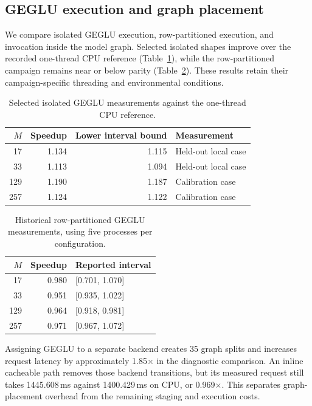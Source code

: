 \documentclass[sigplan,screen,review]{acmart}
\begin{document}
\subsection{GEGLU execution and graph placement}

We compare isolated GEGLU execution, row-partitioned execution, and invocation inside the model graph. Selected isolated shapes improve over the recorded one-thread CPU reference (Table~\ref{tab:geglu-local}), while the row-partitioned campaign remains near or below parity (Table~\ref{tab:geglu-hybrid}). These results retain their campaign-specific threading and environmental conditions.

\begin{table}[t]
\centering
\caption{Selected isolated GEGLU measurements against the one-thread CPU reference.}
\label{tab:geglu-local}
\small
\begin{tabular}{@{}rrrl@{}}
\toprule
$M$ & Speedup & Lower interval bound & Measurement \\
\midrule
17 & 1.134 & 1.115 & Held-out local case \\
33 & 1.113 & 1.094 & Held-out local case \\
129 & 1.190 & 1.187 & Calibration case \\
257 & 1.124 & 1.122 & Calibration case \\
\bottomrule
\end{tabular}
\end{table}

\begin{table}[t]
\centering
\caption{Historical row-partitioned GEGLU measurements, using five processes per configuration.}
\label{tab:geglu-hybrid}
\small
\begin{tabular}{@{}rrl@{}}
\toprule
$M$ & Speedup & Reported interval \\
\midrule
17 & 0.980 & [0.701, 1.070] \\
33 & 0.951 & [0.935, 1.022] \\
129 & 0.964 & [0.918, 0.981] \\
257 & 0.971 & [0.967, 1.072] \\
\bottomrule
\end{tabular}
\end{table}

Assigning GEGLU to a separate backend creates 35 graph splits and increases request latency by approximately 1.85$\times$ in the diagnostic comparison. An inline cacheable path removes those backend transitions, but its measured request still takes 1445.608\,ms against 1400.429\,ms on CPU, or 0.969$\times$. This separates graph-placement overhead from the remaining staging and execution costs.
\end{document}
